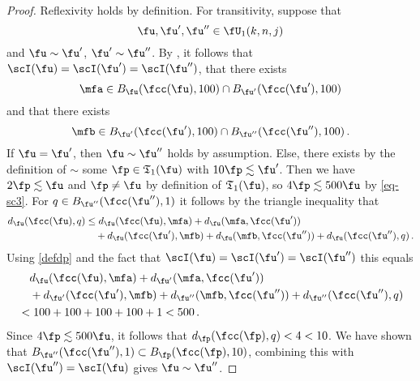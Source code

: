 \begin{proof}
    Reflexivity holds by definition.
    For transitivity, suppose that
    \begin{equation*}
        \fu, \fu', \fu'' \in \fU_1(k,n,j)
    \end{equation*}
    and $\fu \sim \fu'$, $\fu' \sim \fu''$.
    By , it follows that $\scI(\fu) =\scI(\fu') = \scI(\fu'')$, that there exists
    \begin{equation*}
        \mfa \in B_{\fu}(\fcc(\fu), 100) \cap B_{\fu'}(\fcc(\fu'), 100)
    \end{equation*}
    and that there exists
    \begin{equation*}
        \mfb \in B_{\fu'}(\fcc(\fu'), 100) \cap B_{\fu''}(\fcc(\fu''), 100)\, .
    \end{equation*}
    If $\fu = \fu'$, then $\fu \sim \fu''$ holds by assumption. Else, there exists by the definition of $\sim$ some $\fp \in \mathfrak{T}_1(\fu)$ with $10\fp\lesssim \fu'$.
    Then we have $2\fp \lesssim \fu$ and $\fp \ne \fu$ by definition of $\mathfrak{T}_1(\fu)$, so $4 \fp \lesssim 500 \fu$ by \eqref{eq-sc3}. For $q \in B_{\fu''}(\fcc(\fu''), 1)$ it follows by the triangle inequality that
    \begin{align*}
        d_{\fu}(\fcc(\fu), q) &\le d_{\fu}(\fcc(\fu), \mfa) + d_{\fu}(\mfa, \fcc(\fu'))\\
        &\quad+ d_{\fu}(\fcc(\fu'), \mfb) + d_{\fu}(\mfb, \fcc(\fu'')) +
        d_{\fu}(\fcc(\fu''), q)\,.
    \end{align*}
    Using \eqref{defdp} and the fact that $\scI(\fu) = \scI(\fu') = \scI(\fu'')$ this equals
    \begin{align*}
        &\quad d_{\fu}(\fcc(\fu), \mfa) + d_{\fu'}(\mfa, \fcc(\fu'))\\
        &\quad+ d_{\fu'}(\fcc(\fu'), \mfb) + d_{\fu''}(\mfb, \fcc(\fu'')) +
        d_{\fu''}(\fcc(\fu''), q)\\
        &< 100 + 100 + 100 + 100 + 1 < 500\,.
    \end{align*}
    Since $4\fp \lesssim 500 \fu$, it follows that $d_{\fp}(\fcc(\fp), q) < 4 < 10$. We have shown that $B_{\fu''}(\fcc(\fu''), 1) \subset B_{\fp}(\fcc(\fp), 10)$, combining this with $\scI(\fu'') = \scI(\fu)$ gives $\fu \sim \fu''$.


\end{proof}
